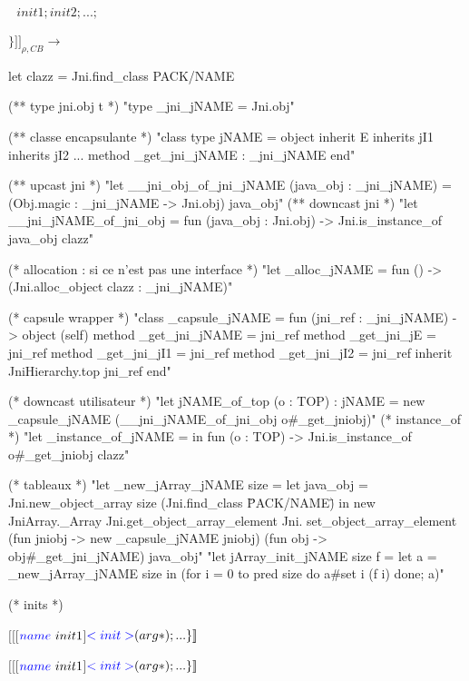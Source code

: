 \documentclass[a4paper, 11pt]{report}
\begin{document}
  $\ \ \ init1; init2; ...;$

 $\} ]\!]_{\rho,CB}\longrightarrow$
\ 
\newline

\begin{OCaml}
let clazz = Jni.find_class PACK/NAME

(** type jni.obj t *)
"type _jni_jNAME = Jni.obj"

(** classe encapsulante *)
"class type jNAME =
   object inherit E
   inherits jI1
   inherits jI2 ...
   method _get_jni_jNAME : _jni_jNAME
   end"

(** upcast jni *)
"let __jni_obj_of_jni_jNAME (java_obj : _jni_jNAME) =
   (Obj.magic : _jni_jNAME -> Jni.obj) java_obj"
(** downcast jni *)
"let __jni_jNAME_of_jni_obj =
   fun (java_obj : Jni.obj) ->
     Jni.is_instance_of java_obj clazz"
 
(* allocation : si ce n'est pas une interface *)
"let _alloc_jNAME =
     fun () -> (Jni.alloc_object clazz : _jni_jNAME)"

(* capsule wrapper *)
"class _capsule_jNAME = fun (jni_ref : _jni_jNAME) ->
    object (self)
      method _get_jni_jNAME = jni_ref
      method _get_jni_jE = jni_ref
      method _get_jni_jI1 = jni_ref
      method _get_jni_jI2 = jni_ref
      inherit JniHierarchy.top jni_ref
    end"

(* downcast utilisateur *)
"let jNAME_of_top (o : TOP) : jNAME =
    new _capsule_jNAME (__jni_jNAME_of_jni_obj o#_get_jniobj)"
(* instance_of *)
"let _instance_of_jNAME =
    in fun (o : TOP) -> Jni.is_instance_of o#_get_jniobj clazz"

(* tableaux *)
"let _new_jArray_jNAME size =
    let java_obj = Jni.new_object_array size (Jni.find_class \"PACK/NAME\")
    in
      new JniArray._Array Jni.get_object_array_element Jni.
        set_object_array_element (fun jniobj -> new _capsule_jNAME jniobj)
        (fun obj -> obj#_get_jni_jNAME) java_obj"
"let jArray_init_jNAME size f =
    let a = _new_jArray_jNAME size
    in (for i = 0 to pred size do a#set i (f i) done; a)"

(* inits *)
\end{OCaml}

$[\![$[$ {\color{blue}name}\ init1 $]${\color{blue} <init>} (arg*); ...\}
]\!]$

$[\![$[$ {\color{blue}name}\ init1 $]${\color{blue} <init>} (arg*); ...\}
]\!]$
\end{document}
